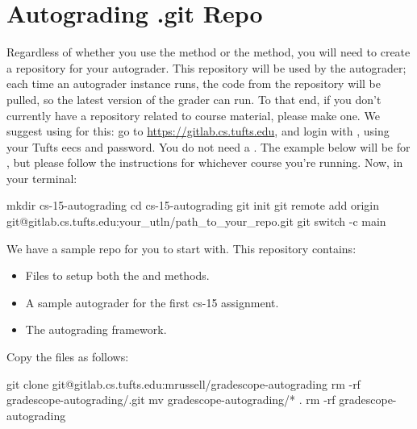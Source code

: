 \documentclass[11pt]{report}
\begin{document}
\section*{Autograding .git Repo}
Regardless of whether you use the  method or the  method, you will need to
create a  repository for your autograder. This repository will be used by the autograder; 
each time an autograder instance runs, the code from the repository will be pulled, so the latest version
of the grader can run. To that end, if you don't currently have a repository related to course material, please make one. 
We suggest using  for this: go to \textcolor{blue}{\href{https://gitlab.cs.tufts.edu}{https://gitlab.cs.tufts.edu}}, and 
login with , using your Tufts eecs  and password. You do not need a .
The example below will be for , but please follow the instructions for whichever course you're running.
Now, in your terminal:
\begin{bashcodeblock}
mkdir cs-15-autograding
cd cs-15-autograding
git init
git remote add origin git@gitlab.cs.tufts.edu:your_utln/path_to_your_repo.git
git switch -c main 
\end{bashcodeblock}
We have a sample repo for you to start with. This repository contains:
\begin{itemize}
      \item Files to setup both the  and  methods.
      \item A sample autograder for the first cs-15 assignment. 
      \item The autograding framework.
\end{itemize}
Copy the files as follows:
\begin{bashcodeblock}
git clone git@gitlab.cs.tufts.edu:mrussell/gradescope-autograding
rm -rf gradescope-autograding/.git
mv gradescope-autograding/* .
rm -rf gradescope-autograding
\end{bashcodeblock}
\end{document}
